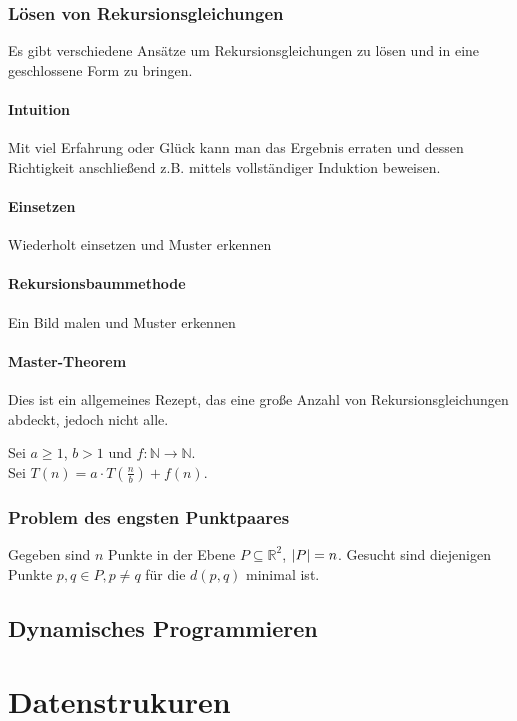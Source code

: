 \subsubsection{Lösen von Rekursionsgleichungen}

Es gibt verschiedene Ansätze um Rekursionsgleichungen zu lösen und in eine geschlossene Form zu bringen.

\paragraph{Intuition}
Mit viel Erfahrung oder Glück kann man das Ergebnis erraten und dessen
Richtigkeit anschließend z.B. mittels vollständiger Induktion beweisen.

\paragraph{Einsetzen} Wiederholt einsetzen und Muster erkennen

\paragraph{Rekursionsbaummethode} Ein Bild malen und Muster erkennen

\paragraph{Master-Theorem}
Dies ist ein allgemeines Rezept, das eine große Anzahl von Rekursionsgleichungen
abdeckt, jedoch nicht alle.

Sei $a \geq 1$, $b > 1$ und $f: \mathbb{N} \rightarrow \mathbb{N}$.\\
Sei $T(n) = a \cdot T(\frac{n}{b}) + f(n)$.

\subsubsection{Problem des engsten Punktpaares}

Gegeben sind $n$ Punkte in der Ebene $P \subseteq \mathbb{R}^2$, $\left|P\right| = n$.
Gesucht sind diejenigen Punkte $p, q \in P, p \neq q$ für die $d(p, q)$ minimal ist.

\subsection{Dynamisches Programmieren}



\section{Datenstrukuren}

